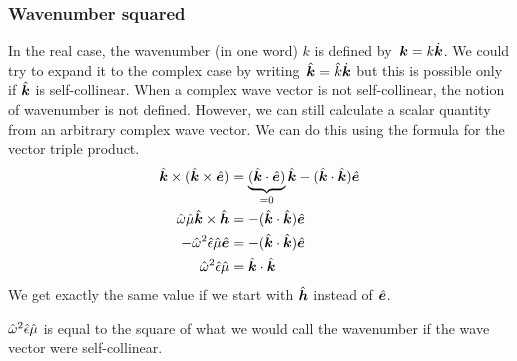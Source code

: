 \subsubsection{Wavenumber squared}
\label{sec:wavenumber_squared}
In the real case, the wavenumber (in one word) $k$ is defined by~$\bm{k}=k \dot{\bm{k}}$.
We could try to expand it to the complex case by writing~$\hat{\bm{k}}=\hat{k} \dot{\bm{k}}$
but this is possible only if $\hat{\bm{k}}$ is self-collinear.
When a complex wave vector is not self-collinear, the notion of wavenumber is not defined.
However, we can still calculate a scalar quantity from an arbitrary complex wave vector.
We can do this using the formula for the vector triple product.
\begin{subequations}
    \label{eq:k_dot_k}
    \begin{align}
        \hat{\bm{k}} \times (\hat{\bm{k}} \times \hat{\bm{e}})
        &=
        \underbrace{(\hat{\bm{k}} \cdot \hat{\bm{e}})}_{=0}\hat{\bm{k}}
        -
        (\hat{\bm{k}} \cdot \hat{\bm{k}}) \hat{\bm{e}}
        \\
        \hat{\omega} \hat{\mu} \hat{\bm{k}} \times \hat{\bm{h}}
        &=
        -(\hat{\bm{k}} \cdot \hat{\bm{k}}) \hat{\bm{e}}
        \\
        -\hat{\omega}^2 \hat{\epsilon} \hat{\mu} \hat{\bm{e}}
        &=
        -(\hat{\bm{k}} \cdot \hat{\bm{k}}) \hat{\bm{e}}
        \\
        \hat{\omega}^2 \hat{\epsilon} \hat{\mu}
        &=
        \hat{\bm{k}} \cdot \hat{\bm{k}}
    \end{align}
\end{subequations}
We get exactly the same value if we start with $\hat{\bm{h}}$ instead of $\hat{\bm{e}}$.

$\hat{\omega}^2 \hat{\epsilon} \hat{\mu}$ is equal to the square of what we would call the wavenumber if the wave vector were self-collinear.

